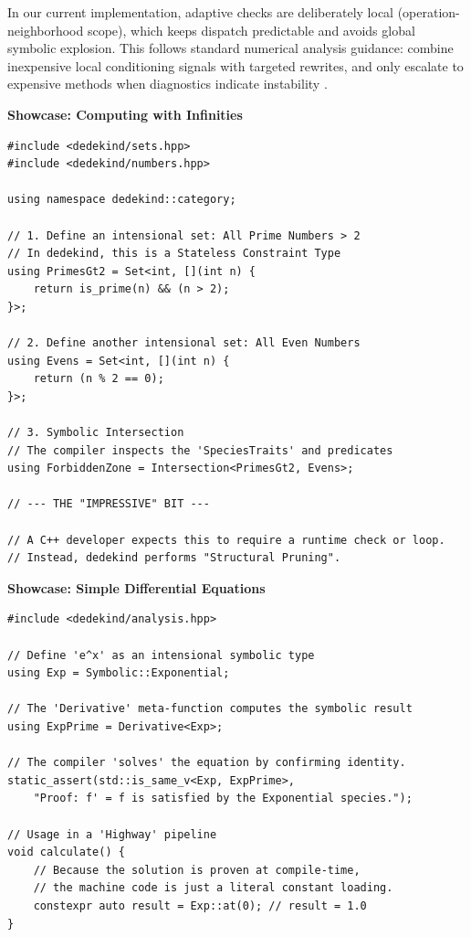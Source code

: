 \documentclass[11pt, a4paper]{report}
\begin{document}
In our current implementation, adaptive checks are deliberately local
(operation-neighborhood scope), which keeps dispatch predictable and avoids
global symbolic explosion. This follows standard numerical analysis guidance:
combine inexpensive local conditioning signals with targeted rewrites, and only
escalate to expensive methods when diagnostics indicate instability
\cite{higham2002accuracy}.

\textbf{Showcase: Computing with Infinities}

\begin{lstlisting}[caption={Showing that the intersection of two non-overlapping sequences is the empty set.}, label={lst:showcase:infinities}]
#include <dedekind/sets.hpp>
#include <dedekind/numbers.hpp>

using namespace dedekind::category;

// 1. Define an intensional set: All Prime Numbers > 2
// In dedekind, this is a Stateless Constraint Type
using PrimesGt2 = Set<int, [](int n) {
    return is_prime(n) && (n > 2); 
}>;

// 2. Define another intensional set: All Even Numbers
using Evens = Set<int, [](int n) {
    return (n % 2 == 0);
}>;

// 3. Symbolic Intersection
// The compiler inspects the 'SpeciesTraits' and predicates
using ForbiddenZone = Intersection<PrimesGt2, Evens>;

// --- THE "IMPRESSIVE" BIT ---

// A C++ developer expects this to require a runtime check or loop.
// Instead, dedekind performs "Structural Pruning".
\end{lstlisting}

\textbf{Showcase: Simple Differential Equations}


\begin{lstlisting}[caption={Compile-time solution of a simple differential equation.}, label={lst:showcase:differentials}]
#include <dedekind/analysis.hpp>

// Define 'e^x' as an intensional symbolic type
using Exp = Symbolic::Exponential; 

// The 'Derivative' meta-function computes the symbolic result
using ExpPrime = Derivative<Exp>;

// The compiler 'solves' the equation by confirming identity.
static_assert(std::is_same_v<Exp, ExpPrime>, 
    "Proof: f' = f is satisfied by the Exponential species.");

// Usage in a 'Highway' pipeline
void calculate() {
    // Because the solution is proven at compile-time, 
    // the machine code is just a literal constant loading.
    constexpr auto result = Exp::at(0); // result = 1.0
}
\end{lstlisting}
\end{document}
